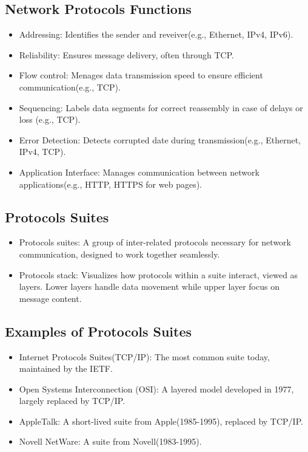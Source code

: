 \documentclass[a4paper,11pt]{article}
\begin{document}
\subsection{Network Protocols Functions}
\begin{itemize}
    \item Addressing: Identifies the sender and reveiver(e.g., Ethernet, IPv4, IPv6).\\
    \item Reliability: Ensures message delivery, often through TCP.
    \item Flow control: Menages data transmission speed to ensure efficient communication(e.g., TCP).\\
    \item Sequencing: Labels data segments for correct reassembly in case of delays or loss (e.g., TCP).\\
    \item Error Detection: Detects corrupted date during transmission(e.g., Ethernet, IPv4, TCP).\\
    \item Application Interface: Manages communication between network applications(e.g., HTTP, HTTPS for web pages).\\
\end{itemize}


\subsection{Protocols Suites}
\begin{itemize}
    \item Protocols suites: A group of inter-related protocols necessary for network communication, designed to work together seamlessly.\\
    \item Protocols stack: Visualizes  how protocols within a suite interact, viewed as layers. Lower layers handle data movement while upper layer focus on message content.\\
\end{itemize}

\subsection{Examples of Protocols Suites}
\begin{itemize}
    \item Internet Protocols Suites(TCP/IP): The most common suite today, maintained by the IETF.\\
    \item Open Systems Interconnection (OSI): A layered model developed in 1977, largely replaced by TCP/IP.\\
    \item AppleTalk: A short-lived suite from Apple(1985-1995), replaced by TCP/IP.\\
    \item Novell NetWare: A suite from Novell(1983-1995).\\
\end{itemize}
\end{document}
